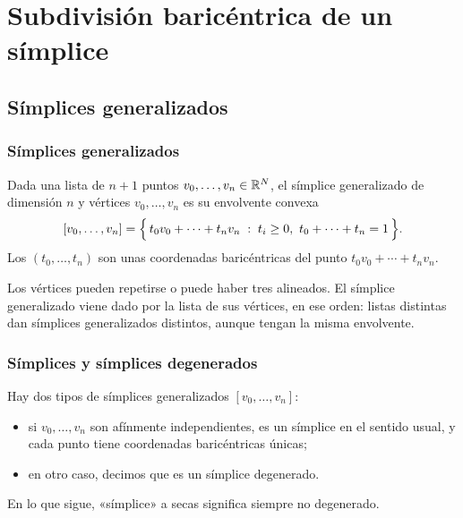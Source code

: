 \section{Subdivisión baricéntrica de un símplice}

\subsection{Símplices generalizados}

\begin{frame}
  \frametitle{Símplices generalizados}

  \begin{definition}
    Dada una lista de $n+1$ puntos $v_0,\ldots,v_n\in\mathbb{R}^N$, el
    \alert{símplice generalizado} de dimensión $n$ y vértices
    $v_0,\ldots,v_n$ es su envolvente convexa
    \[
      [v_0,\ldots,v_n]=\Bigl\{\,t_0v_0+\cdots+t_nv_n \;:\;
      t_i\geq0,\ t_0+\cdots+t_n=1\,\Bigr\}.
    \]
    Los $(t_0,\ldots,t_n)$ son \alert{unas coordenadas baricéntricas} del punto
    $t_0v_0+\cdots+t_nv_n$.
  \end{definition}

  \medskip

  Los vértices pueden repetirse o puede haber tres alineados.
  El símplice generalizado viene dado por la
  \alert{lista} de sus vértices, en ese orden: listas distintas dan
  símplices generalizados distintos, aunque tengan la misma envolvente.
\end{frame}

\begin{frame}
  \frametitle{Símplices y símplices degenerados}

  Hay dos tipos de símplices generalizados $[v_0,\ldots,v_n]$:
  \begin{itemize}
    \item si $v_0,\ldots,v_n$ son afínmente independientes, es un
      \alert{símplice} en el sentido usual, y cada punto tiene
      coordenadas baricéntricas \alert{únicas};
    \item en otro caso, decimos que es un \alert{símplice degenerado}.
  \end{itemize}

  \medskip

  En lo que sigue, «símplice» a secas significa siempre no degenerado.
\end{frame}

